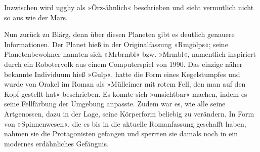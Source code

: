 
\cleardoubleoddpage

%

\cleardoubleoddpage

%

\cleardoubleoddpage

%

\cleardoubleoddpage

%

\cleardoubleoddpage

%

\cleardoubleoddpage

%

\cleardoubleoddpage

%
%
%
%
%
%

Inzwischen wird ugghy als »Örz-ähnlich« beschrieben und sieht vermutlich nicht so aus wie der Mars.

Nun zurück zu Blärg, denn über diesen Planeten gibt es deutlich genauere Informationen. Der Planet hieß in der Originalfassung »Rmgölps«; seine Planetenbewohner nannten sich »Mrbrmbl« bzw. »Mrmbl«, namentlich inspiriert durch ein Robotervolk aus einem Computerspiel von 1990. Das einzige näher bekannte Individuum hieß »Gulp«, hatte die Form eines Kegelstumpfes und wurde von Orakel im Roman als »Mülleimer mit rotem Fell, den man auf den Kopf gestellt hat« beschrieben. Es konnte sich »unsichtbar« machen, indem es seine Fellfärbung der Umgebung anpasste. Zudem war es, wie alle seine Artgenossen, dazu in der Lage, seine Körperform beliebig zu verändern. In Form von »Spinnenwesen«, die es bis in die aktuelle Romanfassung geschafft haben, nahmen sie die Protagonisten gefangen und sperrten sie damals noch in ein modernes erdähnliches Gefängnis.

